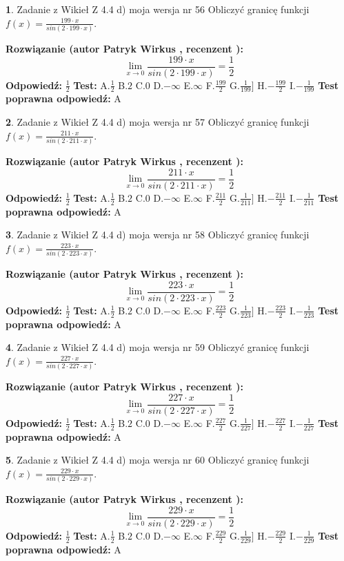 \documentclass[12pt, a4paper]{article}
\theoremstyle{definition} %
\newtheorem{zad}{}
\newcommand{\zadStart}[1]{\begin{zad}#1\newline}
\newcommand{\zadStop}{\end{zad}}
\newcommand{\rozwStart}[2]{\noindent \textbf{Rozwiązanie (autor #1 , recenzent #2): }\newline}
\newcommand{\rozwStop}{\newline}
\newcommand{\odpStart}{\noindent \textbf{Odpowiedź:}\newline}
\newcommand{\odpStop}{\newline}
\newcommand{\testStart}{\noindent \textbf{Test:}\newline}
\newcommand{\testStop}{\newline}
\newcommand{\kluczStart}{\noindent \textbf{Test poprawna odpowiedź:}\newline}
\newcommand{\kluczStop}{\newline}
\begin{document}
\zadStart{Zadanie z Wikieł Z 4.4 d) moja wersja nr 56}
Obliczyć granicę funkcji $f(x)=\frac{199\cdot x}{sin(2 \cdot199\cdot x)}$.
\zadStop
\rozwStart{Patryk Wirkus}{}
$$\lim\limits_{x\to 0}\frac{199\cdot x}{sin(2 \cdot199\cdot x)}=\frac{1}{2}$$
\rozwStop
\odpStart
$\frac{1}{2}$
\odpStop
\testStart
A.$\frac{1}{2}$
B.$2$
C.$0$
D.$-\infty$
E.$\infty$
F.$\frac{199}{2}$
G.$\frac{1}{199}]$
H.$-\frac{199}{2}$
I.$-\frac{1}{199}$
\testStop
\kluczStart
A
\kluczStop



\zadStart{Zadanie z Wikieł Z 4.4 d) moja wersja nr 57}
Obliczyć granicę funkcji $f(x)=\frac{211\cdot x}{sin(2 \cdot211\cdot x)}$.
\zadStop
\rozwStart{Patryk Wirkus}{}
$$\lim\limits_{x\to 0}\frac{211\cdot x}{sin(2 \cdot211\cdot x)}=\frac{1}{2}$$
\rozwStop
\odpStart
$\frac{1}{2}$
\odpStop
\testStart
A.$\frac{1}{2}$
B.$2$
C.$0$
D.$-\infty$
E.$\infty$
F.$\frac{211}{2}$
G.$\frac{1}{211}]$
H.$-\frac{211}{2}$
I.$-\frac{1}{211}$
\testStop
\kluczStart
A
\kluczStop



\zadStart{Zadanie z Wikieł Z 4.4 d) moja wersja nr 58}
Obliczyć granicę funkcji $f(x)=\frac{223\cdot x}{sin(2 \cdot223\cdot x)}$.
\zadStop
\rozwStart{Patryk Wirkus}{}
$$\lim\limits_{x\to 0}\frac{223\cdot x}{sin(2 \cdot223\cdot x)}=\frac{1}{2}$$
\rozwStop
\odpStart
$\frac{1}{2}$
\odpStop
\testStart
A.$\frac{1}{2}$
B.$2$
C.$0$
D.$-\infty$
E.$\infty$
F.$\frac{223}{2}$
G.$\frac{1}{223}]$
H.$-\frac{223}{2}$
I.$-\frac{1}{223}$
\testStop
\kluczStart
A
\kluczStop



\zadStart{Zadanie z Wikieł Z 4.4 d) moja wersja nr 59}
Obliczyć granicę funkcji $f(x)=\frac{227\cdot x}{sin(2 \cdot227\cdot x)}$.
\zadStop
\rozwStart{Patryk Wirkus}{}
$$\lim\limits_{x\to 0}\frac{227\cdot x}{sin(2 \cdot227\cdot x)}=\frac{1}{2}$$
\rozwStop
\odpStart
$\frac{1}{2}$
\odpStop
\testStart
A.$\frac{1}{2}$
B.$2$
C.$0$
D.$-\infty$
E.$\infty$
F.$\frac{227}{2}$
G.$\frac{1}{227}]$
H.$-\frac{227}{2}$
I.$-\frac{1}{227}$
\testStop
\kluczStart
A
\kluczStop



\zadStart{Zadanie z Wikieł Z 4.4 d) moja wersja nr 60}
Obliczyć granicę funkcji $f(x)=\frac{229\cdot x}{sin(2 \cdot229\cdot x)}$.
\zadStop
\rozwStart{Patryk Wirkus}{}
$$\lim\limits_{x\to 0}\frac{229\cdot x}{sin(2 \cdot229\cdot x)}=\frac{1}{2}$$
\rozwStop
\odpStart
$\frac{1}{2}$
\odpStop
\testStart
A.$\frac{1}{2}$
B.$2$
C.$0$
D.$-\infty$
E.$\infty$
F.$\frac{229}{2}$
G.$\frac{1}{229}]$
H.$-\frac{229}{2}$
I.$-\frac{1}{229}$
\testStop
\kluczStart
A
\kluczStop
\end{document}
